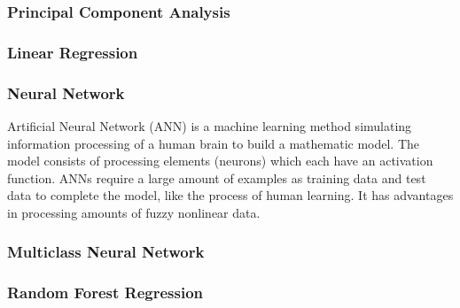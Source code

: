 \documentclass[titlepage]{article}
\begin{document}
\subsubsection*{Principal Component Analysis}
\subsubsection*{Linear Regression}
\subsubsection*{Neural Network}
Artificial Neural Network (ANN) is a machine learning method simulating information processing of a human brain to build a mathematic model. The model consists of processing elements (neurons) which each have an activation function. ANNs require a large amount of examples as training data and test data to complete the model, like the process of human learning. It has advantages in processing amounts of fuzzy nonlinear data.
\subsubsection*{Multiclass Neural Network}
\subsubsection*{Random Forest Regression}
\end{document}
